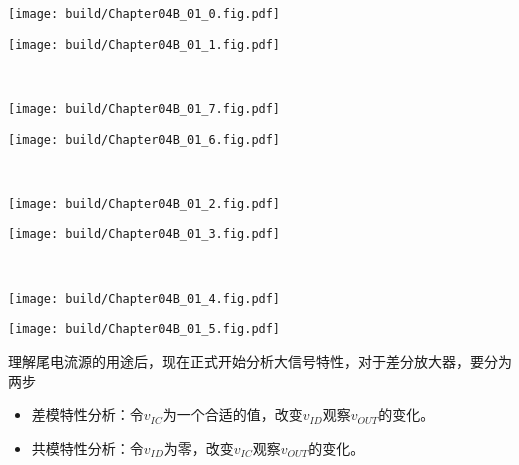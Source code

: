 \begin{Figure}[电流镜负载的差分放大器的差模特性]
    \begin{FigureSub}
        \texttt{[image: build/Chapter04B\_01\_0.fig.pdf]}
    \end{FigureSub}
    \begin{FigureSub}
        \texttt{[image: build/Chapter04B\_01\_1.fig.pdf]}
    \end{FigureSub}\\ \vspace{0.75cm}
    \begin{FigureSub}
        \texttt{[image: build/Chapter04B\_01\_7.fig.pdf]}
    \end{FigureSub}
    \begin{FigureSub}
        \texttt{[image: build/Chapter04B\_01\_6.fig.pdf]}
    \end{FigureSub}\\ \vspace{0.75cm}
    \begin{FigureSub}
        \texttt{[image: build/Chapter04B\_01\_2.fig.pdf]}
    \end{FigureSub}
    \begin{FigureSub}
        \texttt{[image: build/Chapter04B\_01\_3.fig.pdf]}
    \end{FigureSub}\\ \vspace{0.75cm}
    \begin{FigureSub}
        \texttt{[image: build/Chapter04B\_01\_4.fig.pdf]}
    \end{FigureSub}
    \begin{FigureSub}
        \texttt{[image: build/Chapter04B\_01\_5.fig.pdf]}
    \end{FigureSub}
\end{Figure}

理解尾电流源的用途后，现在正式开始分析大信号特性，对于差分放大器，要分为两步
\begin{itemize}
    \item 差模特性分析：令$v_{IC}$为一个合适的值，改变$v_{ID}$观察$v_{OUT}$的变化。
    \item 共模特性分析：令$v_{ID}$为零，改变$v_{IC}$观察$v_{OUT}$的变化。
\end{itemize}

